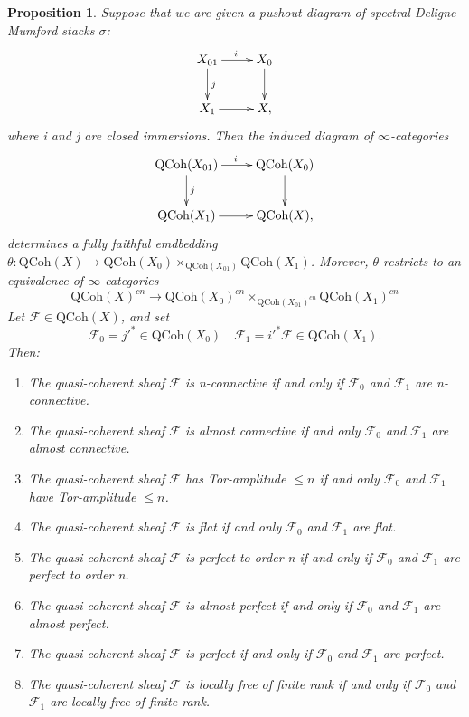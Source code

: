 \documentclass[12pt]{article}
\newtheorem{proposition}[theorem]{Proposition}
\theoremstyle{thry}
\def  \QCoh     {\mathrm{QCoh}}
\def  \cf       {\mathcal{F}}
\begin{document}
\begin{proposition} \cite[Theorem 16.2.0.1, Proposition 16.2.3.1]{lu-SAG} \label{Deformation of Sheaf}
	Suppose that we are given a pushout diagram of spectral Deligne-Mumford stacks $\sigma$:
	$$
	\xymatrix{
		X_{01} \ar[r]^{i}  \ar[d]^{j}  &  X_0 \ar[d] \\
		X_1 \ar[r]  &  X,   \\
	}
	$$
	where i and j are closed immersions. Then the induced diagram of $\infty$-categories
    $$
	\xymatrix{
		\QCoh(X_{01}) \ar[r]^{i}  \ar[d]^{j}  &  \QCoh(X_0) \ar[d] \\
		\QCoh(X_1) \ar[r]  &  \QCoh(X),   \\
	}
	$$
	determines a fully faithful emdbedding $\theta: \QCoh(X) \to \QCoh(X_0) \times_{\QCoh(X_{01})} \QCoh(X_1)$. Morever, $\theta$ restricts to an equivalence of $\infty$-categories
	$$
	\QCoh(X)^{cn} \to \QCoh(X_0)^{cn} \times_{\QCoh(X_{01})^{cn}}  \QCoh(X_1)^{cn}
	$$
	Let $\cf \in \QCoh(X)$, and set 
	$$
	\cf_0  = j'^{*} \in \QCoh(X_0)  \quad  \cf_1 = i'^{*} \cf \in  \QCoh(X_1).
	$$
	Then:
	\begin{enumerate}
		\item The quasi-coherent sheaf $\cf$ is n-connective if and only if $\cf_0$ and $\cf_1$ are n-connective.
		\item  The quasi-coherent sheaf $\cf$ is almost connective if and only $\cf_0$ and $\cf_1$ are almost connective.
		\item  The quasi-coherent sheaf $\cf$ has Tor-amplitude $\leq n$ if and only $\cf_0$ and $\cf_1$ have Tor-amplitude $\leq n$.
		\item The quasi-coherent sheaf $\cf$ is flat if and only $\cf_0$ and $\cf_1$ are flat.
		\item  The quasi-coherent sheaf $\cf$ is perfect  to order n if and only if $\cf_0$ and $\cf_1$ are perfect to order n.
		\item The quasi-coherent sheaf $\cf$ is almost perfect if and only if $\cf_0$ and $\cf_1$ are almost perfect.
		\item The quasi-coherent sheaf $\cf$ is perfect  if and only if $\cf_0$ and $\cf_1$ are perfect.
		\item The quasi-coherent sheaf $\cf$ is locally free of finite rank if and only if $\cf_0$ and $\cf_1$ are locally free of finite rank.
	\end{enumerate}
\end{proposition}
\end{document}

